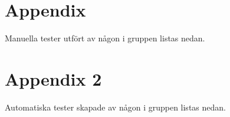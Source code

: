 \documentclass[10pt]{article}
\begin{document}
\pagebreak
\setlength{\parindent}{0pt}
\section{Appendix}
\label{sec:appendix}
Manuella tester utfört av någon i gruppen listas nedan.



\pagebreak
\section{Appendix 2}
\label{sec:apendix2}
Automatiska tester skapade av någon i gruppen listas nedan.

\pagebreak
\printbibliography
\end{document}

